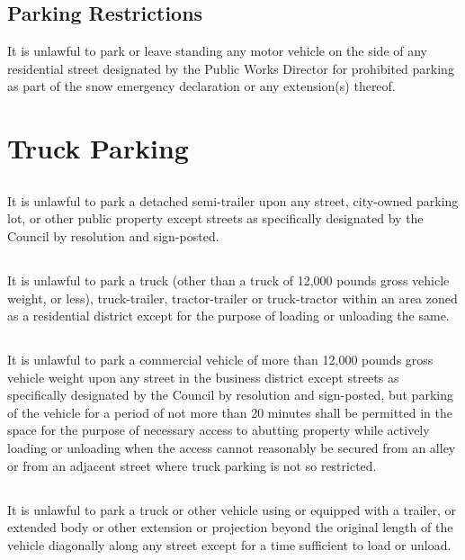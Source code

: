 \subsection{Parking Restrictions}
It is unlawful to park or leave standing any motor vehicle on the side of any residential street designated by the Public Works Director for prohibited parking as part of the snow emergency declaration or any extension(s) thereof.

\section{Truck Parking}
\subsection{}
It is unlawful to park a detached semi-trailer upon any street, city-owned parking lot, or other public property except streets as specifically designated by the Council by resolution and sign-posted.
\subsection{}
It is unlawful to park a truck (other than a truck of 12,000 pounds gross vehicle weight, or less), truck-trailer, tractor-trailer or truck-tractor within an area zoned as a residential district except for the purpose of loading or unloading the same.
\subsection{}
It is unlawful to park a commercial vehicle of more than 12,000 pounds gross vehicle weight upon any street in the business district except streets as specifically designated by the Council by resolution and sign-posted, but parking of the vehicle for a period of not more than 20 minutes shall be permitted in the space for the purpose of necessary access to abutting property while actively loading or unloading when the access cannot reasonably be secured from an alley or from an adjacent street where truck parking is not so restricted.
\subsection{}
It is unlawful to park a truck or other vehicle using or equipped with a trailer, or extended body or other extension or projection beyond the original length of the vehicle diagonally along any street except for a time sufficient to load or unload.
